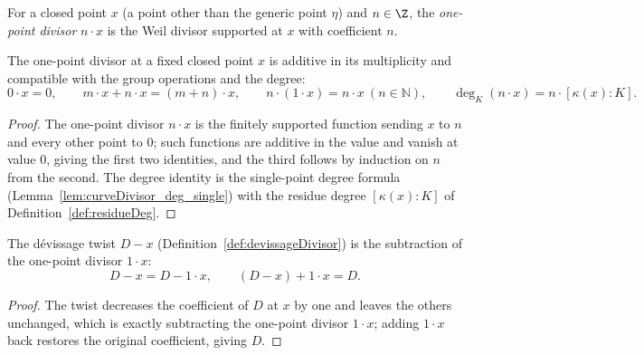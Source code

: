 \begin{definition}
  \label{def:curveDivisor_single}
  \leanok
  For a closed point \(x\) (a point other than the generic point \(\eta\)) and \(n \in \Z\), the
  \emph{one-point divisor} \(n \cdot x\) is the Weil divisor supported at \(x\) with coefficient
  \(n\).
\end{definition}

\begin{lemma}
  \label{lem:curveDivisor_single_arith}
  \leanok
  The one-point divisor at a fixed closed point \(x\) is additive in its multiplicity and
  compatible with the group operations and the degree:
  \[
    0 \cdot x = 0, \qquad m \cdot x + n \cdot x = (m+n)\cdot x, \qquad
    n \cdot (1 \cdot x) = n \cdot x \ (n \in \mathbb N), \qquad
    \deg_K(n \cdot x) = n \cdot [\kappa(x):K].
  \]
\end{lemma}
\begin{proof}
  \leanok
  The one-point divisor \(n \cdot x\) is the finitely supported function sending \(x\) to \(n\)
  and every other point to \(0\); such functions are additive in the value and vanish at value
  \(0\), giving the first two identities, and the third follows by induction on \(n\) from the
  second. The degree identity is the single-point degree formula
  (Lemma~\ref{lem:curveDivisor_deg_single}) with the residue degree
  \([\kappa(x):K]\) of Definition~\ref{def:residueDeg}.
\end{proof}

\begin{lemma}
  \label{lem:devissageDivisor_sub}
  \leanok
  The dévissage twist \(D - x\) (Definition~\ref{def:devissageDivisor}) is the subtraction of the
  one-point divisor \(1 \cdot x\):
  \[
    D - x = D - 1 \cdot x, \qquad (D - x) + 1\cdot x = D .
  \]
\end{lemma}
\begin{proof}
  \leanok
  The twist decreases the coefficient of \(D\) at \(x\) by one and leaves the others unchanged,
  which is exactly subtracting the one-point divisor \(1 \cdot x\); adding \(1 \cdot x\) back
  restores the original coefficient, giving \(D\).
\end{proof}

